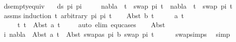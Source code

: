 \begin{isabellebody}
\endisatagproof
{\isafoldproof}%
%
\isadelimproof
\isanewline
%
\endisadelimproof
\isanewline
\isanewline
{}\isamarkupfalse%
\ ds{\isacharunderscore}{\kern0pt}empty{\isacharunderscore}{\kern0pt}equiv{\isacharunderscore}{\kern0pt}{}{\isacharcolon}{\kern0pt}\isanewline
\ \ \ {\isachardoublequoteopen}ds\ pi{}\ pi{}\ {\isacharequal}{\kern0pt}\ {\isacharbraceleft}{\kern0pt}{\isacharbraceright}{\kern0pt}{\isachardoublequoteclose}\isanewline
\ \ \ {\isachardoublequoteopen}nabla\ {\isasymturnstile}\ t{}\ {\isasymapprox}\ swap\ pi{}\ t{}\ {\isasymLongrightarrow}\ nabla\ {\isasymturnstile}\ t{}\ {\isasymapprox}\ swap\ pi{}\ t{}{\isachardoublequoteclose}\isanewline
%
\isadelimproof
%
\endisadelimproof
%
\isatagproof
{}\isamarkupfalse%
\ assms\isanewline
{}\isamarkupfalse%
{\isacharparenleft}{\kern0pt}induction\ t{}\ arbitrary{\isacharcolon}{\kern0pt}\ pi{}\ pi{}\ t{}{\isacharparenright}{\kern0pt}\isanewline
\ \ \isamarkupfalse%
\ {\isacharparenleft}{\kern0pt}Abst\ b\ t{}{\isacharprime}{\kern0pt}{\isacharparenright}{\kern0pt}\isanewline
\ \ \isamarkupfalse%
\ \isamarkupfalse%
\ a\ t{}{\isacharprime}{\kern0pt}\isanewline
\ \ \ \ \ t{}{\isacharcolon}{\kern0pt}\ {\isachardoublequoteopen}t{}\ {\isacharequal}{\kern0pt}\ Abst\ a\ t{}{\isacharprime}{\kern0pt}{\isachardoublequoteclose}\isanewline
\ \ \ \ \isamarkupfalse%
{\isacharparenleft}{\kern0pt}auto\ elim{\isacharcolon}{\kern0pt}\ equ{\isachardot}{\kern0pt}cases{\isacharparenright}{\kern0pt}\isanewline
\ \ \isamarkupfalse%
\ Abst\ \isamarkupfalse%
\ i{\isacharcolon}{\kern0pt}\ {\isachardoublequoteopen}nabla\ {\isasymturnstile}\ Abst\ a\ t{}{\isacharprime}{\kern0pt}\ {\isasymapprox}\ Abst\ {\isacharparenleft}{\kern0pt}swapas\ pi{}\ b{\isacharparenright}{\kern0pt}\ {\isacharparenleft}{\kern0pt}swap\ pi{}\ t{}{\isacharprime}{\kern0pt}{\isacharparenright}{\kern0pt}{\isachardoublequoteclose}\isanewline
\ \ \ \ \isamarkupfalse%
\ swap{\isachardot}{\kern0pt}simps{\isacharparenleft}{\kern0pt}{}{\isacharparenright}{\kern0pt}\ \isamarkupfalse%
\ simp\isanewline
\ \ \isamarkupfalse%
\ \isamarkupfalse%

\end{isabellebody}
